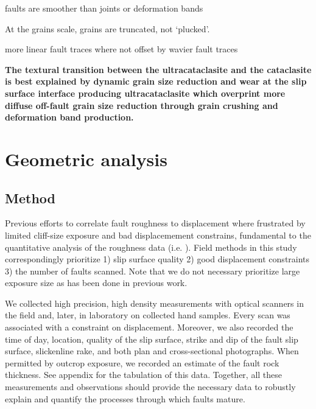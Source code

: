 \documentclass[12pt,a4paper]{article}
\begin{document}

faults are smoother than joints or deformation bands

At the grains scale, grains are truncated, not `plucked'.

more linear fault traces where not offset by wavier fault traces


\textbf{The textural transition between the ultracataclasite and the cataclasite is best explained  by dynamic grain size reduction and wear at the slip surface interface producing ultracataclasite which overprint more diffuse off-fault grain size reduction through grain crushing and deformation band production.} 

	
\section{Geometric analysis}		

\subsection{Method}

Previous efforts to correlate fault roughness to displacement where frustrated by limited cliff-size exposure and bad displacemement constrains, fundamental to the quantitative analysis of the roughness data (i.e. \cite{sagy2007evolution, brodsky2011faults, candela2012roughness}). Field methods in this study correspondingly prioritize 1) slip surface quality 2) good displacement constraints 3) the number of faults scanned. Note that we do not necessary prioritize large exposure size as has been done in previous work.

We collected high precision, high density measurements with optical scanners in the field and, later, in laboratory on collected hand samples. Every scan was associated with a constraint on displacement. Moreover, we also recorded the time of day, location, quality of the slip surface, strike and dip of the fault slip surface, slickenline rake, and both plan and cross-sectional photographs. When permitted by outcrop exposure, we recorded an estimate of the fault rock thickness. See appendix for the tabulation of this data. Together, all these measurements and observations should provide the necessary data to robustly explain and quantify the processes through which faults mature.
\end{document}
